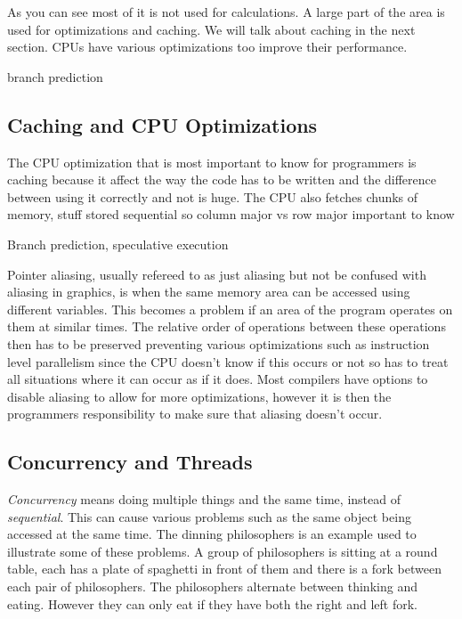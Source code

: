 \documentclass[10pt,a4paper]{report}
\begin{document}

As you can see most of it is not used for calculations. A large part of the area is used for optimizations and caching. We will talk about caching in the next section. CPUs have various optimizations too improve their performance.

branch prediction


\subsection{Caching and CPU Optimizations}
The CPU optimization that is most important to know for programmers is caching because it affect the way the code has to be written and the difference between using it correctly and not is huge.
The CPU also fetches chunks of memory, stuff stored sequential so column major vs row major important to know


\cite{drepper2007cpumemory}

Branch prediction, speculative execution

Pointer aliasing, usually refereed to as just aliasing but not be confused with aliasing in graphics, is when the same memory area can be accessed using different variables. This becomes a problem if an area of the program operates on them at similar times. The relative order of operations between these operations then has to be preserved preventing various optimizations such as instruction level parallelism since the CPU doesn't know if this occurs or not so has to treat all situations where it can occur as if it does. Most compilers have options to disable aliasing to allow for more optimizations, however it is then the programmers responsibility to make sure that aliasing doesn't occur.

\subsection{Concurrency and Threads}
\label{concurrency}
\emph{Concurrency} means doing multiple things and the same time, instead of \emph{sequential}. This can cause various problems such as the same object being accessed at the same time. The dinning philosophers is an example  used to illustrate some of these problems. A group of philosophers is sitting at a round table, each has a plate of spaghetti in front of them and there is a fork between each pair of philosophers. The philosophers alternate between thinking and eating. However they can only eat if they have both the right and left fork.
\end{document}
